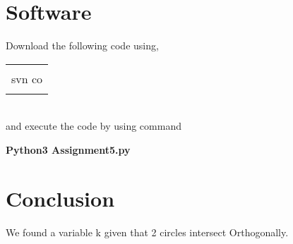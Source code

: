 \documentclass[journal,12pt,twocolumn]{IEEEtran}
\begin{document}
\section{Software}
Download the following code using,
\begin{table}[h]
    \centering
    \begin{tabular}{|c|}
    \hline \\
         svn co   \\
         \\
   \hline
    \end{tabular}
\end{table}
\\
and execute the code by using command
\begin{center}
\textbf{Python3  Assignment5.py}\\
\end{center}

\section{Conclusion}
We found a variable k given that 2 circles intersect Orthogonally.\\
\end{document}
